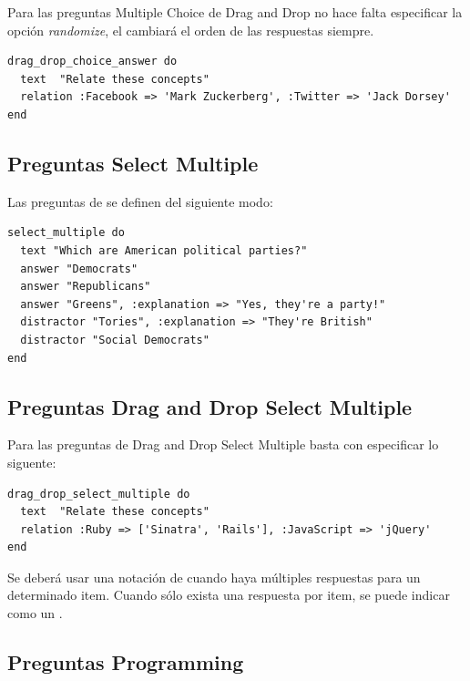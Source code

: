 Para las preguntas Multiple Choice de Drag and Drop no hace falta especificar la opci\'on \textit{randomize}, el  cambiar\'a el orden de las 
respuestas siempre.
\begin{verbatim}
drag_drop_choice_answer do
  text  "Relate these concepts"
  relation :Facebook => 'Mark Zuckerberg', :Twitter => 'Jack Dorsey'
end
\end{verbatim}

\subsection{Preguntas Select Multiple}
\label{subsec:Apendice2.6}

Las preguntas de  se definen del siguiente modo:
\begin{verbatim}
select_multiple do
  text "Which are American political parties?"
  answer "Democrats"
  answer "Republicans"
  answer "Greens", :explanation => "Yes, they're a party!"
  distractor "Tories", :explanation => "They're British"
  distractor "Social Democrats"
end
\end{verbatim}

\subsection{Preguntas Drag and Drop Select Multiple}
\label{subsec:Apendice2.7}

Para las preguntas de Drag and Drop Select Multiple basta con especificar lo siguente:
\begin{verbatim}
drag_drop_select_multiple do
  text  "Relate these concepts"
  relation :Ruby => ['Sinatra', 'Rails'], :JavaScript => 'jQuery'
end
\end{verbatim}

Se deber\'a usar una notaci\'on de  cuando haya m\'ultiples respuestas para un determinado item. Cuando s\'olo exista una respuesta por item,
se puede indicar como un .

\subsection{Preguntas Programming}
\label{subsec:Apendice2.8}

